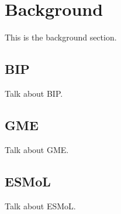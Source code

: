\section{Background}

This is the background section.

\subsection{BIP}

Talk about BIP.

\subsection{GME}

Talk about GME.

\subsection{ESMoL}

Talk about ESMoL.